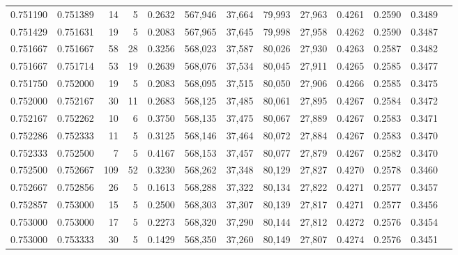 \begin{tabular}{rrrrrrrrrrrrr}
0.751190 & 0.751389 &    14 &   5 &                                     0.2632 & 567,946 &  37,664 &  79,993 &  27,963 & 0.4261 & 0.2590 & 0.3489 \\
0.751429 & 0.751631 &    19 &   5 &                                     0.2083 & 567,965 &  37,645 &  79,998 &  27,958 & 0.4262 & 0.2590 & 0.3487 \\
0.751667 & 0.751667 &    58 &  28 &                                     0.3256 & 568,023 &  37,587 &  80,026 &  27,930 & 0.4263 & 0.2587 & 0.3482 \\
0.751667 & 0.751714 &    53 &  19 &                                     0.2639 & 568,076 &  37,534 &  80,045 &  27,911 & 0.4265 & 0.2585 & 0.3477 \\
0.751750 & 0.752000 &    19 &   5 &                                     0.2083 & 568,095 &  37,515 &  80,050 &  27,906 & 0.4266 & 0.2585 & 0.3475 \\
0.752000 & 0.752167 &    30 &  11 &                                     0.2683 & 568,125 &  37,485 &  80,061 &  27,895 & 0.4267 & 0.2584 & 0.3472 \\
0.752167 & 0.752262 &    10 &   6 &                                     0.3750 & 568,135 &  37,475 &  80,067 &  27,889 & 0.4267 & 0.2583 & 0.3471 \\
0.752286 & 0.752333 &    11 &   5 &                                     0.3125 & 568,146 &  37,464 &  80,072 &  27,884 & 0.4267 & 0.2583 & 0.3470 \\
0.752333 & 0.752500 &     7 &   5 &                                     0.4167 & 568,153 &  37,457 &  80,077 &  27,879 & 0.4267 & 0.2582 & 0.3470 \\
0.752500 & 0.752667 &   109 &  52 &                                     0.3230 & 568,262 &  37,348 &  80,129 &  27,827 & 0.4270 & 0.2578 & 0.3460 \\
0.752667 & 0.752856 &    26 &   5 &                                     0.1613 & 568,288 &  37,322 &  80,134 &  27,822 & 0.4271 & 0.2577 & 0.3457 \\
0.752857 & 0.753000 &    15 &   5 &                                     0.2500 & 568,303 &  37,307 &  80,139 &  27,817 & 0.4271 & 0.2577 & 0.3456 \\
0.753000 & 0.753000 &    17 &   5 &                                     0.2273 & 568,320 &  37,290 &  80,144 &  27,812 & 0.4272 & 0.2576 & 0.3454 \\
0.753000 & 0.753333 &    30 &   5 &                                     0.1429 & 568,350 &  37,260 &  80,149 &  27,807 & 0.4274 & 0.2576 & 0.3451 \\

\end{tabular}
